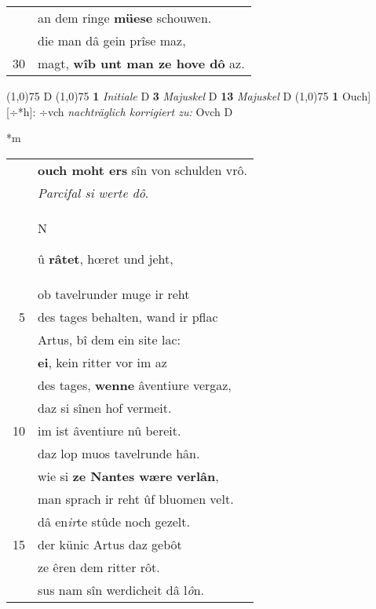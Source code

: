 \documentclass[8pt,a4paper,notitlepage]{article}
\begin{document}
\begin{table}[ht]
\begin{minipage}[t]{0.5\linewidth}
\begin{tabular}{rl}
 & an dem ringe \textbf{müese} schouwen.\\ 
 & die man dâ gein prîse maz,\\ 
30 & magt, \textbf{wîb unt man ze hove dô} az.\\ 
\end{tabular}
\scriptsize
\line(1,0){75} \newline
D \newline
\line(1,0){75} \newline
\textbf{1} \textit{Initiale} D  \textbf{3} \textit{Majuskel} D  \textbf{13} \textit{Majuskel} D  \newline
\line(1,0){75} \newline
\textbf{1} Ouch] [÷*h]: ÷vch \textit{nachträglich korrigiert zu:} Ovch D \newline
\end{minipage}
\hspace{0.5cm}
\begin{minipage}[t]{0.5\linewidth}
\small
\begin{center}*m
\end{center}
\begin{tabular}{rl}
 & \textbf{ouch moht ers} sîn von schulden vrô.\\ 
 & \textit{Parcifal si werte dô}.\\ 
 & \begin{large}N\end{large}û \textbf{râtet}, hœret und jeht,\\ 
 & ob tavelrunder muge ir reht\\ 
5 & des tages behalten, wand ir pflac\\ 
 & Artus, bî dem ein site lac:\\ 
 & \textbf{ei}, kein ritter vor im az\\ 
 & des tages, \textbf{wenne} âventiure vergaz,\\ 
 & daz si sînen hof vermeit.\\ 
10 & im ist âventiure nû bereit.\\ 
 & daz lop muos tavelrunde hân.\\ 
 & wie si \textbf{ze Nantes wære} \textbf{verlân},\\ 
 & man sprach ir reht ûf bluomen velt.\\ 
 & dâ en\textit{ir}te stûde noch gezelt.\\ 
15 & der künic Artus daz gebôt\\ 
 & ze êren dem ritter rôt.\\ 
 & sus nam sîn werdicheit dâ l\textit{ô}n.\\ 

\end{tabular}
\end{minipage}
\end{table}
\end{document}
